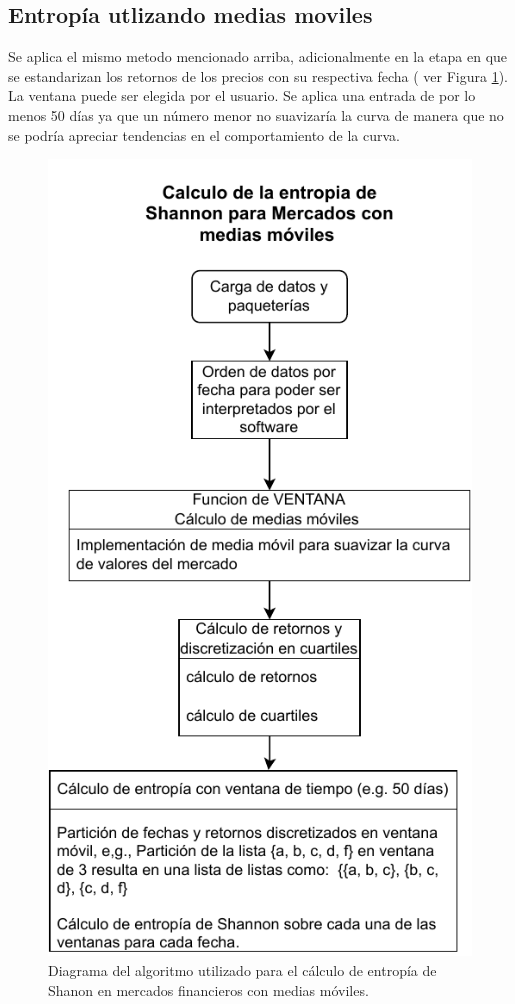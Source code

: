 \subsection{Entropía utlizando medias moviles}

Se aplica el mismo metodo mencionado arriba, adicionalmente en la etapa en que se estandarizan los retornos de los precios con su respectiva fecha ( ver Figura \ref{entropiamav}). La ventana puede ser elegida por el usuario. Se aplica una entrada de por lo menos 50 días ya que un número menor no suavizaría la curva de manera que no se podría apreciar tendencias en el comportamiento de la curva.





\begin{figure}
	\centering
	\includegraphics[width=0.7\linewidth]{figures/entropiaMAV}
	\caption{Diagrama del algoritmo utilizado para el c\'alculo de entrop\'ia de Shanon en mercados financieros con medias m\'oviles.}
	\label{entropiamav}
\end{figure}

